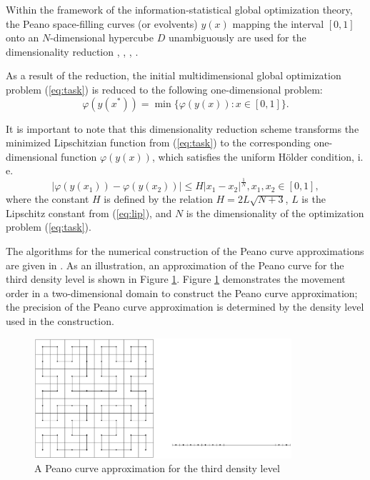 \documentclass[runningheads]{llncs}
\begin{document}
Within the framework of the information-statistical global optimization theory,
the Peano space-filling curves (or evolvents) \(y(x)\) mapping the interval \([0,1]\)
onto an \(N\)-dimensional hypercube \(D\) unambiguously are used for the dimensionality
reduction \cite{sergeyevStronginLera2013}, \cite{strongin1978}, \cite{stronginGergelBarkalovParGO}, \cite{strSergGO}.
\par
As a result of the reduction, the initial multidimensional global optimization
problem (\ref{eq:task}) is reduced to the following one-dimensional problem:
\begin{equation}
\label{eq:oneDimTask}
\varphi(y(x^*))=\min\{\varphi(y(x)):x\in [0,1]\}.
\end{equation}
\par
It is important to note that this dimensionality reduction scheme transforms the minimized
Lipschitzian function from (\ref{eq:task}) to the corresponding one-dimensional
function \(\varphi(y(x))\), which satisfies the uniform H{\"o}lder condition, i. e.
\begin{equation}
\label{eq:holder}
|\varphi(y(x_1))-\varphi(y(x_2))|\leq H{|x_1-x_2|}^{\frac{1}{N}}, x_1,x_2\in[0,1],
\end{equation}
where the constant $H$ is defined by the relation \(H=2L\sqrt{N+3}\), \(L\) is the Lipschitz
constant from (\ref{eq:lip}), and \(N\) is the dimensionality of the optimization problem (\ref{eq:task}).
\par
The algorithms for the numerical construction of the Peano curve approximations are
given in \cite{strSergGO}. As an illustration, an approximation of the Peano curve
for the third density level is shown in Figure \ref{fig:peanoC}. Figure \ref{fig:peanoC}
demonstrates the movement order in a two-dimensional domain to construct the Peano
curve approximation; the precision of the Peano curve approximation is determined by the
density level used in the construction.
\begin{figure}
    \centering
    \includegraphics[width=0.85\textwidth]{pictures/peanoC.eps}
    \caption{A Peano curve approximation for the third density level}
    \label{fig:peanoC}
\end{figure}
\end{document}
